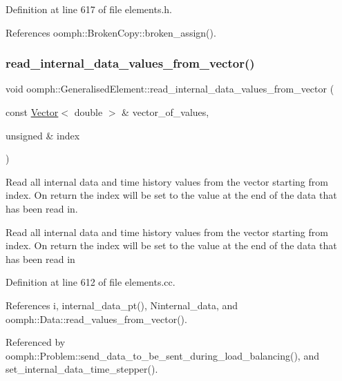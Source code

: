 Definition at line 617 of file elements.\+h.



References oomph\+::\+Broken\+Copy\+::broken\+\_\+assign().

\mbox{\label{classoomph_1_1GeneralisedElement_af4db27d80c24979a9cb822203ff77557}} 
\subsubsection{\texorpdfstring{read\+\_\+internal\+\_\+data\+\_\+values\+\_\+from\+\_\+vector()}{read\_internal\_data\_values\_from\_vector()}}
{\footnotesize\ttfamily void oomph\+::\+Generalised\+Element\+::read\+\_\+internal\+\_\+data\+\_\+values\+\_\+from\+\_\+vector (\begin{DoxyParamCaption}\item[{const \hyperlink{classoomph_1_1Vector}{Vector}$<$ double $>$ \&}]{vector\+\_\+of\+\_\+values,  }\item[{unsigned \&}]{index }\end{DoxyParamCaption})}



Read all internal data and time history values from the vector starting from index. On return the index will be set to the value at the end of the data that has been read in. 

Read all internal data and time history values from the vector starting from index. On return the index will be set to the value at the end of the data that has been read in 

Definition at line 612 of file elements.\+cc.



References i, internal\+\_\+data\+\_\+pt(), Ninternal\+\_\+data, and oomph\+::\+Data\+::read\+\_\+values\+\_\+from\+\_\+vector().



Referenced by oomph\+::\+Problem\+::send\+\_\+data\+\_\+to\+\_\+be\+\_\+sent\+\_\+during\+\_\+load\+\_\+balancing(), and set\+\_\+internal\+\_\+data\+\_\+time\+\_\+stepper().

